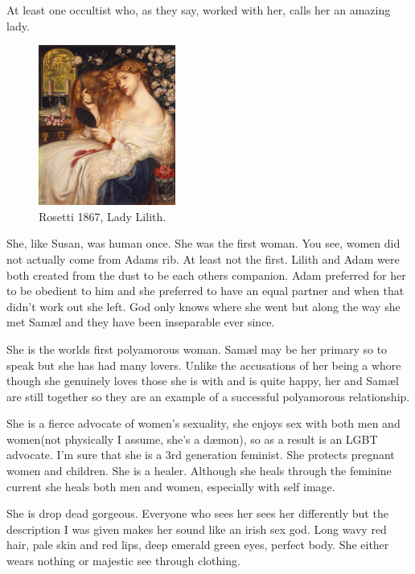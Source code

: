 \documentclass[12pt,twoside,onecolumn,openright,extrafontsizes]{memoir}
\newlength\drop
\begin{document}
{At least one occultist who, as they say, worked with her, calls her an amazing lady.


\begin{figure}
	\centering
	\includegraphics[width=0.40\textwidth]{Images/Rossetti_lady_lilith_1867}
	\\ {\small Rosetti 1867, Lady Lilith.}
\end{figure}


She, like Susan, was human once. She was the first woman. You see, women did not actually come from Adams rib. At least not the first. Lilith and Adam were both created from the dust to be each others companion. Adam preferred for her to be obedient to him and she preferred to have an equal partner and when that didn't work out she left. God only knows where she went but along the way she met Sam\ae l and they have been inseparable ever since.

She is the worlds first polyamorous woman. Sam\ae l may be her primary so to speak but she has had many lovers. Unlike the accusations of her being a whore though she genuinely loves those she is with and is quite happy, her and Sam\ae l are still together so they are an example of a successful polyamorous relationship.

She is a fierce advocate of women's sexuality, she enjoys sex with both men and women(not physically I assume, she's a d\ae mon), so as a result is an LGBT advocate. I'm sure that she is a 3rd generation feminist. She protects pregnant women and children. She is a healer. Although she heals through the feminine current she heals both men and women, especially with self image.

She is drop dead gorgeous. Everyone who sees her sees her differently but the description I was given makes her sound like an irish sex god. Long wavy red hair, pale skin and red lips, deep emerald green eyes, perfect body. She either wears nothing or majestic see through clothing.

}
\end{document}
